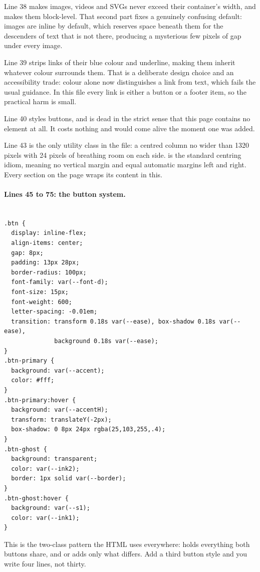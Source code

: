 Line 38 makes images, videos and SVGs never exceed their container's width, and
makes them block-level. That second part fixes a genuinely confusing default:
images are inline by default, which reserves space beneath them for the descenders
of text that is not there, producing a mysterious few pixels of gap under every
image.

Line 39 strips links of their blue colour and underline, making them inherit
whatever colour surrounds them. That is a deliberate design choice and an
accessibility trade: colour alone now distinguishes a link from text, which fails
the usual guidance. In this file every link is either a button or a footer item, so
the practical harm is small.

Line 40 styles buttons, and is dead in the strict sense that this page contains no
 element at all. It costs nothing and would come alive the moment
one was added.

Line 43 is the only utility class in the file: a centred column no wider than 1320
pixels with 24 pixels of breathing room on each side.  is the
standard centring idiom, meaning no vertical margin and equal automatic margins
left and right. Every section on the page wraps its content in this.

\paragraph{Lines 45 to 75: the button system.}

\begin{lstlisting}[firstnumber=44,caption={\file{css/site.css}, lines 44--75}]

.btn {
  display: inline-flex;
  align-items: center;
  gap: 8px;
  padding: 13px 28px;
  border-radius: 100px;
  font-family: var(--font-d);
  font-size: 15px;
  font-weight: 600;
  letter-spacing: -0.01em;
  transition: transform 0.18s var(--ease), box-shadow 0.18s var(--ease),
              background 0.18s var(--ease);
}
.btn-primary {
  background: var(--accent);
  color: #fff;
}
.btn-primary:hover {
  background: var(--accentH);
  transform: translateY(-2px);
  box-shadow: 0 8px 24px rgba(25,103,255,.4);
}
.btn-ghost {
  background: transparent;
  color: var(--ink2);
  border: 1px solid var(--border);
}
.btn-ghost:hover {
  background: var(--s1);
  color: var(--ink1);
}
\end{lstlisting}

This is the two-class pattern the HTML uses everywhere:  holds
everything both buttons share, and  or  adds
only what differs. Add a third button style and you write four lines, not thirty.

